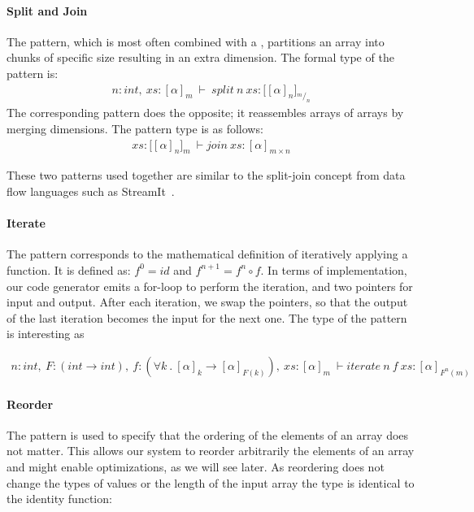 \paragraph{Split and Join}
The  pattern, which is most often combined with a , partitions an array into chunks of specific size resulting in an extra dimension.
The formal type of the  pattern is:
\begin{align}
  n : int,\ xs : [\alpha]_m\ \vdash\ split\ n\ xs : \big[[\alpha]_n\big]_{{}^m/_n}
\end{align}
The corresponding  pattern does the opposite; it reassembles arrays of arrays by merging dimensions.
The  pattern type is as follows:
\begin{align}
  xs : \big[[\alpha]_n\big]_m\ \vdash join\ xs : [\alpha]_{m \times n}
\end{align}

These two patterns used together are similar to the split-join concept from data flow languages such as StreamIt~\cite{thies02streamit}.


\paragraph{Iterate}
The  pattern corresponds to the mathematical definition of iteratively applying a function.
It is defined as: {$f^0 = id$} and {$f^{n+1} = f^n \circ f$}.
In terms of implementation, our code generator emits a for-loop to perform the iteration, and two pointers for input and output.
After each iteration, we swap the pointers, so that the output of the last iteration becomes the input for the next one.
The type of the  pattern is interesting as 

\begin{align}
  n : int,\ F : (int \rightarrow int),\ f : (\forall k\ .\ [\alpha]_k \rightarrow [\alpha]_{F(k)}),\ xs : [\alpha]_m\ %
  \vdash iterate\ n\ f\ xs : [\alpha]_{F^{n}(m)}
\end{align}

\paragraph{Reorder}
The  pattern is used to specify that the ordering of the elements of an array does not matter.
This allows our system to reorder arbitrarily the elements of an array and might enable optimizations, as we will see later.
As reordering does not change the types of values or the length of the input array the type is identical to the identity function:

